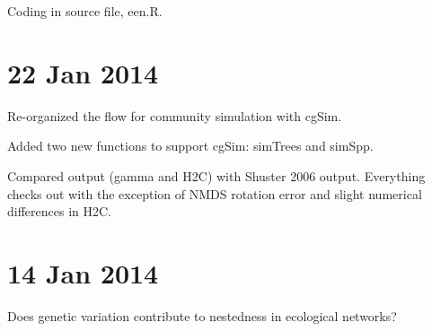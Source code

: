 \documentclass[12pt]{article}
\begin{document}
Coding in source file, een.R. 

\section{22 Jan 2014}

Re-organized the flow for community simulation with cgSim.

Added two new functions to support cgSim: simTrees and simSpp.

Compared output (gamma and H2C) with Shuster 2006 output. Everything
checks out with the exception of NMDS rotation error and slight
numerical differences in H2C.

\section{14 Jan 2014}

Does genetic variation contribute to nestedness in ecological networks?
\end{document}
